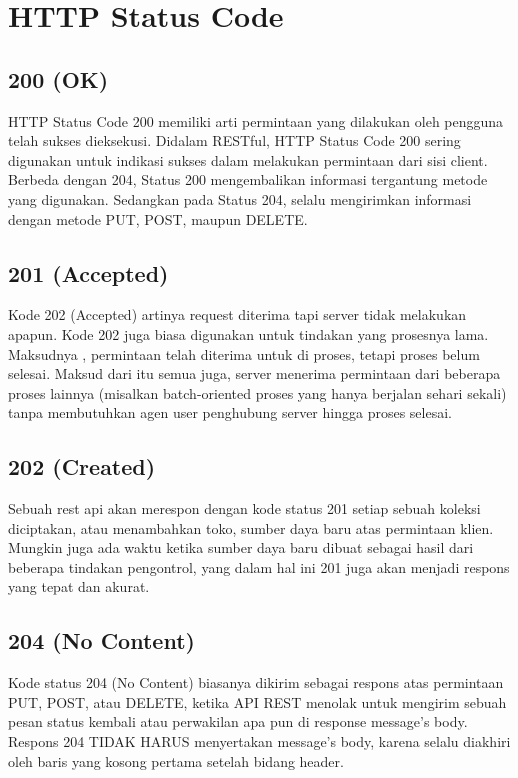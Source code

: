 \section{HTTP Status Code}
\subsection{200 (OK)}
HTTP Status Code 200 memiliki arti permintaan yang dilakukan oleh pengguna telah sukses dieksekusi. Didalam RESTful, HTTP Status Code 200 sering digunakan untuk indikasi sukses dalam melakukan permintaan dari sisi client. Berbeda dengan 204, Status 200 mengembalikan informasi tergantung metode yang digunakan.
Sedangkan pada Status 204, selalu mengirimkan informasi dengan metode PUT, POST, maupun DELETE.
\subsection{201 (Accepted)}
Kode 202 (Accepted) artinya request diterima tapi server tidak melakukan apapun. Kode 202 juga biasa digunakan untuk tindakan yang prosesnya lama. Maksudnya , permintaan telah diterima untuk di proses, tetapi proses belum selesai. 
Maksud dari itu semua juga, server menerima permintaan dari beberapa proses lainnya (misalkan batch-oriented proses yang hanya berjalan sehari sekali) tanpa membutuhkan agen user penghubung server hingga proses selesai.
\subsection{202 (Created)}
Sebuah rest api akan merespon dengan kode status 201 setiap sebuah koleksi diciptakan, atau menambahkan toko, sumber daya baru atas permintaan klien. Mungkin juga ada waktu ketika sumber daya baru dibuat sebagai hasil dari beberapa tindakan pengontrol, yang dalam hal ini 201 juga akan menjadi respons yang tepat dan akurat.
\subsection{204 (No Content)}
Kode status 204 (No Content) biasanya dikirim sebagai respons atas permintaan PUT, POST, atau DELETE, ketika API REST menolak untuk mengirim sebuah pesan status kembali atau perwakilan apa pun di response message’s body.\\
Respons 204 TIDAK HARUS menyertakan message’s body, karena selalu diakhiri oleh baris yang kosong pertama setelah bidang header.